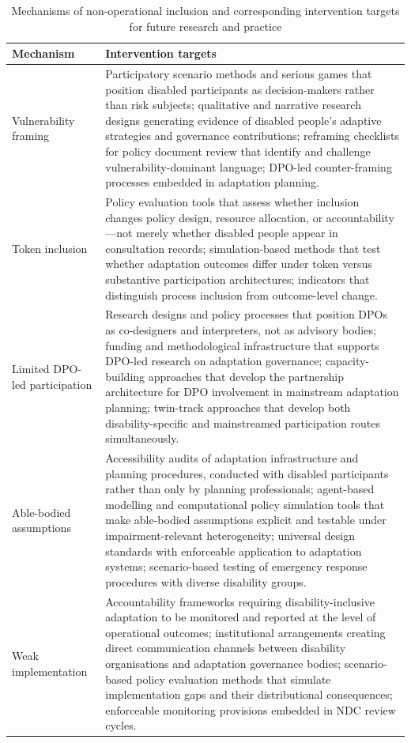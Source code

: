 \documentclass[12pt,a4paper]{article}
\begin{document}
\begin{table}[H]
\centering
\small
\renewcommand{\arraystretch}{1.3}
\caption{Mechanisms of non-operational inclusion and corresponding intervention targets for future research and practice}
\label{tab:intervention-targets}
\begin{tabularx}{\textwidth}{
>{\raggedright\arraybackslash}p{}
>{\raggedright\arraybackslash}X
}
\toprule
\textbf{Mechanism} & \textbf{Intervention targets} \\
\midrule
Vulnerability framing
& Participatory scenario methods and serious games that position disabled participants as decision-makers rather than risk subjects; qualitative and narrative research designs generating evidence of disabled people's adaptive strategies and governance contributions; reframing checklists for policy document review that identify and challenge vulnerability-dominant language; DPO-led counter-framing processes embedded in adaptation planning. \\
\midrule
Token inclusion
& Policy evaluation tools that assess whether inclusion changes policy design, resource allocation, or accountability---not merely whether disabled people appear in consultation records; simulation-based methods that test whether adaptation outcomes differ under token versus substantive participation architectures; indicators that distinguish process inclusion from outcome-level change. \\
\midrule
Limited DPO-led participation
& Research designs and policy processes that position DPOs as co-designers and interpreters, not as advisory bodies; funding and methodological infrastructure that supports DPO-led research on adaptation governance; capacity-building approaches that develop the partnership architecture for DPO involvement in mainstream adaptation planning; twin-track approaches that develop both disability-specific and mainstreamed participation routes simultaneously. \\
\midrule
Able-bodied assumptions
& Accessibility audits of adaptation infrastructure and planning procedures, conducted with disabled participants rather than only by planning professionals; agent-based modelling and computational policy simulation tools that make able-bodied assumptions explicit and testable under impairment-relevant heterogeneity; universal design standards with enforceable application to adaptation systems; scenario-based testing of emergency response procedures with diverse disability groups. \\
\midrule
Weak implementation
& Accountability frameworks requiring disability-inclusive adaptation to be monitored and reported at the level of operational outcomes; institutional arrangements creating direct communication channels between disability organisations and adaptation governance bodies; scenario-based policy evaluation methods that simulate implementation gaps and their distributional consequences; enforceable monitoring provisions embedded in NDC review cycles. \\
\bottomrule
\end{tabularx}
\end{table}
\end{document}
